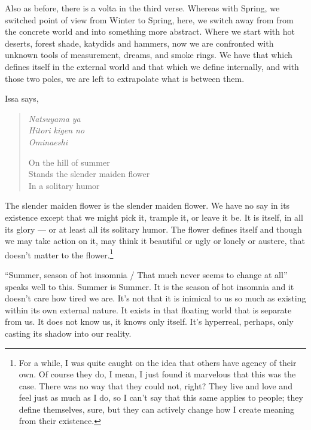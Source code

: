 Also as before, there is a volta in the third verse. Whereas with Spring, we switched point of view from Winter to Spring, here, we switch away from from the concrete world and into something more abstract. Where we start with hot deserts, forest shade, katydids and hammers, now we are confronted with unknown tools of measurement, dreams, and smoke rings. We have that which defines itself in the external world and that which we define internally, and with those two poles, we are left to extrapolate what is between them.

Issa says,

\begin{verse}
\begin{multicols}{2}
\emph{Natsuyama ya} \\
\emph{Hitori kigen no} \\
\emph{Ominaeshi}

\columnbreak

On the hill of summer \\
Stands the slender maiden flower \\
In a solitary humor
\end{multicols}
\vspace{-1em}
\parencite[65]{issa}
\end{verse}

The slender maiden flower is the slender maiden flower. We have no say in its existence except that we might pick it, trample it, or leave it be. It is itself, in all its glory --- or at least all its solitary humor. The flower defines itself and though we may take action on it, may think it beautiful or ugly or lonely or austere, that doesn't matter to the flower.\footnote{For a while, I was quite caught on the idea that others have agency of their own. Of course they do, I mean, I just found it marvelous that this was the case. There was no way that they could not, right? They live and love and feel just as much as I do, so I can't say that this same applies to people; they define themselves, sure, but they can actively change how I create meaning from their existence.\footnotemark}

``Summer, season of hot insomnia / That much never seems to change at all'' speaks well to this. Summer is Summer. It is the season of hot insomnia and it doesn't care how tired we are. It's not that it is inimical to us so much as existing within its own external nature. It exists in that floating world that is separate from us. It does not know us, it knows only itself. It's hyperreal, perhaps, only casting its shadow into our reality.

